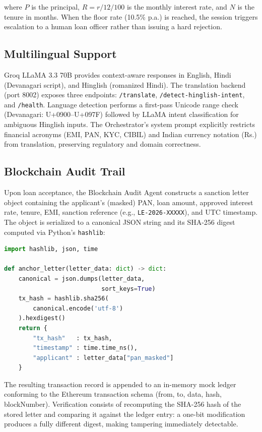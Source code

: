 \documentclass[conference]{IEEEtran}
\newcommand{\rupee}{\textrm{Rs.}}
\begin{document}
\noindent where $P$ is the principal, $R = r/12/100$
is the monthly interest rate, and $N$ is the tenure
in months. When the floor rate (10.5\% p.a.) is
reached, the session triggers escalation to a human
loan officer rather than issuing a hard rejection.

\subsection{Multilingual Support}

Groq LLaMA 3.3 70B provides context-aware responses
in English, Hindi (Devanagari script), and Hinglish
(romanized Hindi). The translation backend (port 8002)
exposes three endpoints: \texttt{/translate},
\texttt{/detect-hinglish-intent}, and \texttt{/health}.
Language detection performs a first-pass Unicode range
check (Devanagari: U+0900--U+097F) followed by
LLaMA intent classification for ambiguous Hinglish inputs.
The Orchestrator's system prompt explicitly restricts
financial acronyms (EMI, PAN, KYC, CIBIL) and Indian
currency notation (\rupee) from translation, preserving
regulatory and domain correctness.

\subsection{Blockchain Audit Trail}

Upon loan acceptance, the Blockchain Audit Agent
constructs a sanction letter object containing the
applicant's (masked) PAN, loan amount, approved
interest rate, tenure, EMI, sanction reference (e.g.,
\texttt{LE-2026-XXXXX}), and UTC timestamp. The
object is serialized to a canonical JSON string and
its SHA-256 digest computed via Python's \texttt{hashlib}:

\begin{lstlisting}[language=Python, caption={SHA-256
blockchain anchor computation}]
import hashlib, json, time

def anchor_letter(letter_data: dict) -> dict:
    canonical = json.dumps(letter_data,
                           sort_keys=True)
    tx_hash = hashlib.sha256(
        canonical.encode('utf-8')
    ).hexdigest()
    return {
        "tx_hash"   : tx_hash,
        "timestamp" : time.time_ns(),
        "applicant" : letter_data["pan_masked"]
    }
\end{lstlisting}

\noindent The resulting transaction record is appended
to an in-memory mock ledger conforming to the
Ethereum transaction schema (from, to, data, hash,
blockNumber). Verification consists of recomputing the
SHA-256 hash of the stored letter and comparing it
against the ledger entry: a one-bit modification
produces a fully different digest, making tampering
immediately detectable.
\end{document}
